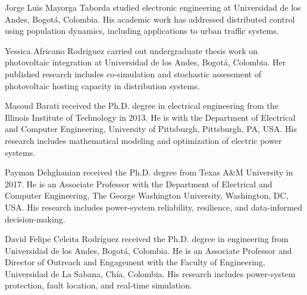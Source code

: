 
\begin{IEEEbiographynophoto}{Jorge Luis Mayorga Taborda}
studied electronic engineering at Universidad de los Andes, Bogot\'a, Colombia. His academic work has addressed distributed control using population dynamics, including applications to urban traffic systems.
\end{IEEEbiographynophoto}

\begin{IEEEbiographynophoto}{Yessica Africano Rodriguez}
carried out undergraduate thesis work on photovoltaic integration at Universidad de los Andes, Bogot\'a, Colombia. Her published research includes co-simulation and stochastic assessment of photovoltaic hosting capacity in distribution systems.
\end{IEEEbiographynophoto}

\begin{IEEEbiographynophoto}{Masoud Barati}
received the Ph.D. degree in electrical engineering from the Illinois Institute of Technology in 2013. He is with the Department of Electrical and Computer Engineering, University of Pittsburgh, Pittsburgh, PA, USA. His research includes mathematical modeling and optimization of electric power systems.
\end{IEEEbiographynophoto}

\begin{IEEEbiographynophoto}{Payman Dehghanian}
received the Ph.D. degree from Texas A\&M University in 2017. He is an Associate Professor with the Department of Electrical and Computer Engineering, The George Washington University, Washington, DC, USA. His research includes power-system reliability, resilience, and data-informed decision-making.
\end{IEEEbiographynophoto}

\begin{IEEEbiographynophoto}{David Felipe Celeita Rodr\'iguez}
received the Ph.D. degree in engineering from Universidad de los Andes, Bogot\'a, Colombia. He is an Associate Professor and Director of Outreach and Engagement with the Faculty of Engineering, Universidad de La Sabana, Ch\'ia, Colombia. His research includes power-system protection, fault location, and real-time simulation.
\end{IEEEbiographynophoto}
